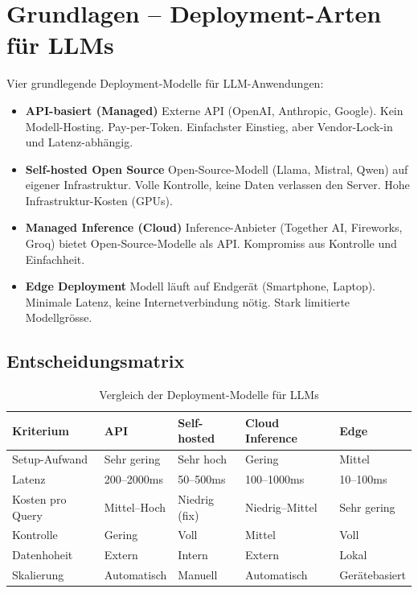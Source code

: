 
\section{Grundlagen -- Deployment-Arten für LLMs}

Vier grundlegende Deployment-Modelle für LLM-Anwendungen:

\begin{itemize}

    \item \textbf{API-basiert (Managed)} Externe API (OpenAI, Anthropic, Google). Kein Modell-Hosting. Pay-per-Token. Einfachster Einstieg, aber Vendor-Lock-in und Latenz-abhängig.
    \item \textbf{Self-hosted Open Source} Open-Source-Modell (Llama, Mistral, Qwen) auf eigener Infrastruktur. Volle Kontrolle, keine Daten verlassen den Server. Hohe Infrastruktur-Kosten (GPUs).
    \item \textbf{Managed Inference (Cloud)} Inference-Anbieter (Together AI, Fireworks, Groq) bietet Open-Source-Modelle als API. Kompromiss aus Kontrolle und Einfachheit.
    \item \textbf{Edge Deployment} Modell läuft auf Endgerät (Smartphone, Laptop). Minimale Latenz, keine Internetverbindung nötig. Stark limitierte Modellgrösse.
\end{itemize}

\subsection{Entscheidungsmatrix}

\begin{table}[H]
\centering
\begin{tabularx}{\linewidth}{lXXXX}
\toprule
\textbf{Kriterium} & \textbf{API} & \textbf{Self-hosted} & \textbf{Cloud Inference} & \textbf{Edge} \\
\midrule
Setup-Aufwand & Sehr gering & Sehr hoch & Gering & Mittel \\
Latenz & 200--2000ms & 50--500ms & 100--1000ms & 10--100ms \\
Kosten pro Query & Mittel--Hoch & Niedrig (fix) & Niedrig--Mittel & Sehr gering \\
Kontrolle & Gering & Voll & Mittel & Voll \\
Datenhoheit & Extern & Intern & Extern & Lokal \\
Skalierung & Automatisch & Manuell & Automatisch & Gerätebasiert \\
\bottomrule
\end{tabularx}
\caption{Vergleich der Deployment-Modelle für LLMs}
\end{table}


